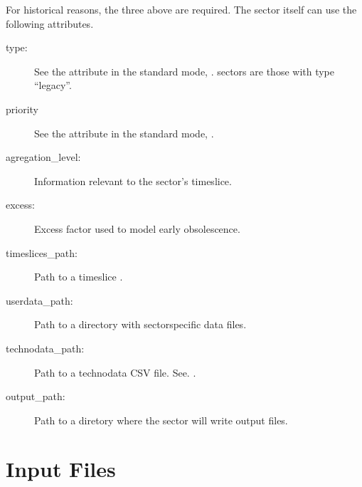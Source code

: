 \documentclass[letterpaper,10pt,english]{sphinxmanual}
\begin{document}
For historical reasons, the three  above are required. The sector
itself can use the following attributes.
\begin{description}
\item[{type:}] \leavevmode
See the attribute in the standard mode, .  sectors
are those with type “legacy”.

\item[{priority}] \leavevmode
See the attribute in the standard mode, .

\item[{agregation\_level:}] \leavevmode
Information relevant to the sector’s timeslice.

\item[{excess:}] \leavevmode
Excess factor used to model early obsolescence.

\item[{timeslices\_path:}] \leavevmode
Path to a timeslice  {\hyperref[\detokenize{inputs/timeslices:inputs-legacy-timeslices}]{}}.

\item[{userdata\_path:}] \leavevmode
Path to a directory with sector\sphinxhyphen{}specific data files.

\item[{technodata\_path:}] \leavevmode
Path to a technodata CSV file. See. {\hyperref[\detokenize{inputs/technodata:inputs-technodata}]{}}.

\item[{output\_path:}] \leavevmode
Path to a diretory where the sector will write output files.

\end{description}


\section{Input Files}
\label{\detokenize{inputs/inputs_csv:input-files}}\label{\detokenize{inputs/inputs_csv::doc}}
\end{document}
